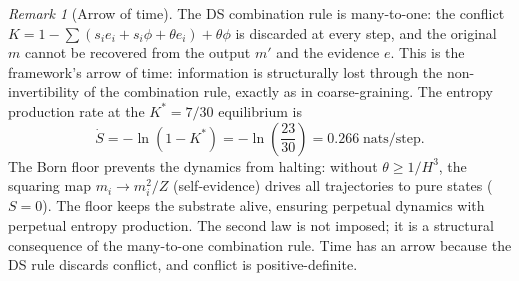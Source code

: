 \documentclass[11pt,a4paper]{article}
\theoremstyle{definition}
\theoremstyle{remark}
\newtheorem{remark}[theorem]{Remark}
\begin{document}
\begin{remark}[Arrow of time]\label{rem:arrow_of_time}
The DS combination rule is many-to-one: the conflict $K=1-\sum(s_ie_i+s_i\phi+\theta e_i)+\theta\phi$ is discarded at every step, and the original $m$ cannot be recovered from the output $m'$ and the evidence $e$. This is the framework's arrow of time: information is structurally lost through the non-invertibility of the combination rule, exactly as in coarse-graining. The entropy production rate at the $K^*=7/30$ equilibrium is
\begin{equation}\label{eq:entropy_rate}
\dot{S} = -\ln(1-K^*) = -\ln\!\left(\frac{23}{30}\right) = 0.266\;\text{nats/step}.
\end{equation}
The Born floor prevents the dynamics from halting: without $\theta\geq 1/H^3$, the squaring map $m_i\to m_i^2/Z$ (self-evidence) drives all trajectories to pure states ($S=0$). The floor keeps the substrate alive, ensuring perpetual dynamics with perpetual entropy production. The second law is not imposed; it is a structural consequence of the many-to-one combination rule. Time has an arrow because the DS rule discards conflict, and conflict is positive-definite.
\end{remark}
\end{document}
